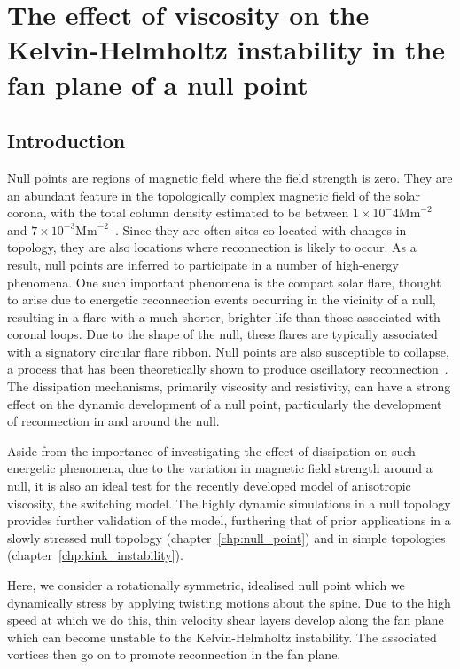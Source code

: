 \chapter{The effect of viscosity on the Kelvin-Helmholtz instability in the fan plane of a null point}

\graphicspath{{images/null_point_khi/}}

\section{Introduction}

Null points are regions of magnetic field where the field strength is zero. They are an abundant feature in the topologically complex magnetic field of the solar corona, with the total column density estimated to be between $1\times 10^-4 \text{Mm}^{-2}$ and $7\times 10^{-3} \text{Mm}^{-2}$~\cite{edwardsNullPointDistribution2015}. Since they are often sites co-located with changes in topology, they are also locations where reconnection is likely to occur. As a result, null points are inferred to participate in a number of high-energy phenomena. One such important phenomena is the compact solar flare, thought to arise due to energetic reconnection events occurring in the vicinity of a null, resulting in a flare with a much shorter, brighter life than those associated with coronal loops. Due to the shape of the null, these flares are typically associated with a signatory circular flare ribbon. Null points are also susceptible to collapse, a process that has been theoretically shown to produce oscillatory reconnection~\cite{thurgoodThreedimensionalOscillatoryMagnetic2017}. The dissipation mechanisms, primarily viscosity and resistivity, can have a strong effect on the dynamic development of a null point, particularly the development of reconnection in and around the null.

Aside from the importance of investigating the effect of dissipation on such energetic phenomena, due to the variation in magnetic field strength around a null, it is also an ideal test for the recently developed model of anisotropic viscosity, the switching model. The highly dynamic simulations in a null topology provides further validation of the model, furthering that of prior applications in a slowly stressed null topology (chapter~\ref{chp:null_point}) and in simple topologies (chapter~\ref{chp:kink_instability}).

Here, we consider a rotationally symmetric, idealised null point which we dynamically stress by applying twisting motions about the spine. Due to the high speed at which we do this, thin velocity shear layers develop along the fan plane which can become unstable to the Kelvin-Helmholtz instability. The associated vortices then go on to promote reconnection in the fan plane. 

